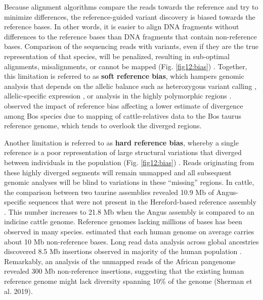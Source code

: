 \documentclass[../main.tex]{subfiles}
\begin{document}
Because alignment algorithms compare the reads towards the reference and try to minimize differences, the reference-guided variant discovery is biased towards the reference bases. In other words, it is easier to align DNA fragments without differences to the reference bases than DNA fragments  that contain non-reference bases. Comparison of the sequencing reads with variants, even if they are the true representation of that species, will be penalized, resulting in sub-optimal alignments, misalignments, or cannot be mapped (Fig. \ref{fig12:bias}) \citep{pritt2018forge}. Together, this limitation is referred to as \textbf{soft reference bias}, which hampers genomic analysis that depends on the allelic balance such as heterozygous variant calling \citep{garrison2018variation}, allelic-specific expression \citep{salavati2019elimination}, or analysis in the highly polymorphic regions \citep{dilthey2015improved}. \citet{wu2018pervasive} observed the impact of reference bias affecting a lower estimate of divergence among Bos species due to mapping of cattle-relatives data to the Bos taurus reference genome, which tends to overlook the diverged regions. 

Another limitation is referred to as \textbf{hard reference bias}, whereby a single reference is a poor representation of large structural variations that diverged between individuals in the population (Fig. \ref{fig12:bias}) \citep{colquhoun2020nucleotide}. Reads originating from these highly diverged segments will remain unmapped and all subsequent genomic analyses will be blind to variations in these “missing” regions. In cattle, the comparison between two taurine assemblies revealed 10.9 Mb of Angus-specific sequences that were not present in the Hereford-based reference assembly \citep{Low2020}. This number increases to 21.8 Mb when the Angus assembly is compared to an indicine cattle genome. Reference genomes lacking millions of bases has been observed in many species. \citet{ameur2018novo,audano2019characterizing} estimated that each human genome on average carries about 10 Mb non-reference bases. Long read data analysis across global ancestries discovered 8.5 Mb insertions observed in majority of the human population \citet{audano2019characterizing}. Remarkably, an analysis of the unmapped reads of the African pangenome revealed 300 Mb non-reference insertions, suggesting that the existing human reference genome might lack diversity spanning 10\% of the genome (Sherman et al. 2019). \\
\end{document}
